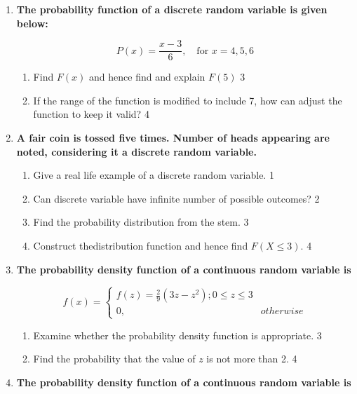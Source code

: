 \documentclass[a4paper,oneside, margin=1.4in]{book}
\begin{document}
\begin{enumerate}
  
   \item
	  \textbf{The probability function of a discrete random variable is given below:} 
  
   \begin{center}
	  \[
P(x) = \frac{x - 3}{6}, \quad \text{for } x = 4, 5, 6
\]
	  \end{center}
  
  \begin{enumerate}
    \item  
	Find $F(x)$ and hence find and explain $F(5)$ \hfill 3
    \item
	If the range of the function is modified to include 7, how can adjust the function to keep it valid? \hfill 4
  \end{enumerate}

  
   \item
	  \textbf{A fair coin is tossed five times. Number of heads appearing are noted, considering it a discrete random variable.} 
  
  \begin{enumerate}
    \item
	Give a real life example of a discrete random variable. \hfill 1
    \item
	Can discrete variable have infinite number of possible outcomes? \hfill 2
    \item  
	Find the probability distribution from the stem. \hfill 3
    \item
	Construct thedistribution function and hence find $F(X \le 3)$. \hfill 4
  \end{enumerate}
  
 \item
  \textbf{The probability density function of a continuous random variable is}

$$
  f(x) =
\begin{cases}
f(z) = \frac29 (3z-z^2); 0 \le z \le 3 \\
0, & otherwise
\end{cases}
$$
  
  \begin{enumerate}
    \item  
	Examine whether the probability density function is appropriate. \hfill 3
    \item
	Find the probability that the value of $z$ is not more than 2. \hfill 4
  \end{enumerate}
  
  \item
  \textbf{The probability density function of a continuous random variable is}


\end{enumerate}
\end{document}

